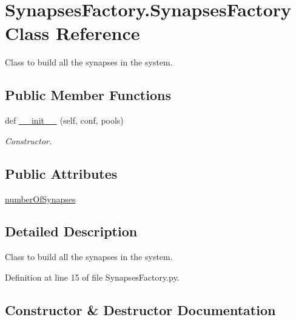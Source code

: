 \hypertarget{class_synapses_factory_1_1_synapses_factory}{}\section{Synapses\+Factory.\+Synapses\+Factory Class Reference}
\label{class_synapses_factory_1_1_synapses_factory}


Class to build all the synapses in the system.  


\subsection*{Public Member Functions}
\begin{DoxyCompactItemize}
\item 
def \hyperlink{class_synapses_factory_1_1_synapses_factory_a4de86ef35a3945787df975afe33733fe}{\+\_\+\+\_\+init\+\_\+\+\_\+} (self, conf, pools)
\begin{DoxyCompactList}\small\item\em Constructor. \end{DoxyCompactList}\end{DoxyCompactItemize}
\subsection*{Public Attributes}
\begin{DoxyCompactItemize}
\item 
\hyperlink{class_synapses_factory_1_1_synapses_factory_af83fbc27851417b677391ece9bf49a29}{number\+Of\+Synapses}
\end{DoxyCompactItemize}


\subsection{Detailed Description}
Class to build all the synapses in the system. 

Definition at line 15 of file Synapses\+Factory.\+py.



\subsection{Constructor \& Destructor Documentation}
